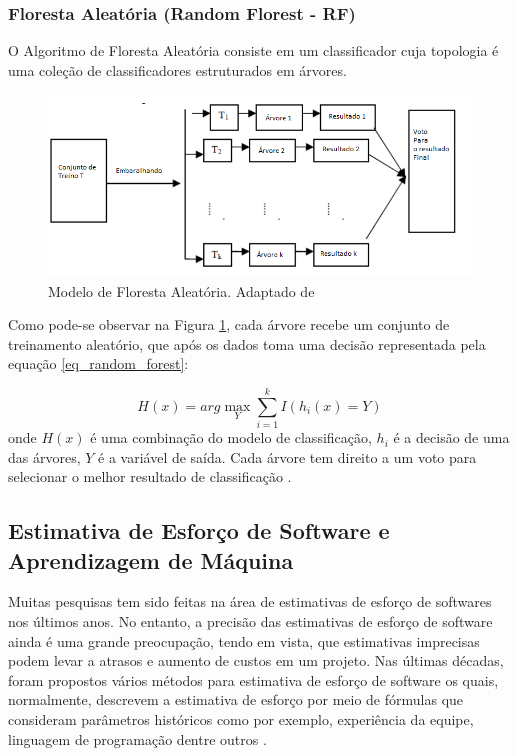 \documentclass[12pt]{article}
\begin{document}
\subsubsection{Floresta Aleatória (Random Florest - RF)}

O Algoritmo de Floresta Aleatória consiste em um classificador cuja topologia é uma coleção de classificadores estruturados em árvores.

\begin{figure}[h]
  \centering
  \includegraphics[width=.4\textwidth]{img/fig_random_forest.png}
  \caption{Modelo de Floresta Aleatória. Adaptado de \cite{liuetal:2012}}
  \label{fig_random_forest}
\end{figure}

Como pode-se observar na Figura \ref{fig_random_forest}, cada árvore recebe um conjunto de treinamento aleatório, que após os dados toma uma decisão representada pela equação \ref{eq_random_forest}:

\begin{equation}
  H(x) = arg \max_Y \sum_{i = 1}^{k} I (h_i(x) = Y)
  \label{eq_random_forest}
\end{equation}
onde $H(x)$ é uma combinação do modelo de classificação, $h_i$ é a decisão de uma das árvores, $Y$ é a variável de saída. Cada árvore tem direito a um voto para selecionar o melhor resultado de classificação \cite{liuetal:2012}.


\subsection{Estimativa de Esforço de Software e Aprendizagem de Máquina}

Muitas pesquisas tem sido feitas na área de estimativas de esforço de softwares nos últimos anos. No entanto, a precisão das estimativas de esforço de software ainda é uma grande preocupação, tendo em vista, que estimativas imprecisas podem levar a atrasos e aumento de custos em um projeto. Nas últimas décadas, foram propostos vários métodos para estimativa de esforço de software os quais, normalmente, descrevem a estimativa de esforço por meio de fórmulas que consideram parâmetros históricos como por exemplo, experiência da equipe, linguagem de programação dentre outros \cite{asadegravino:2019}.
\end{document}
